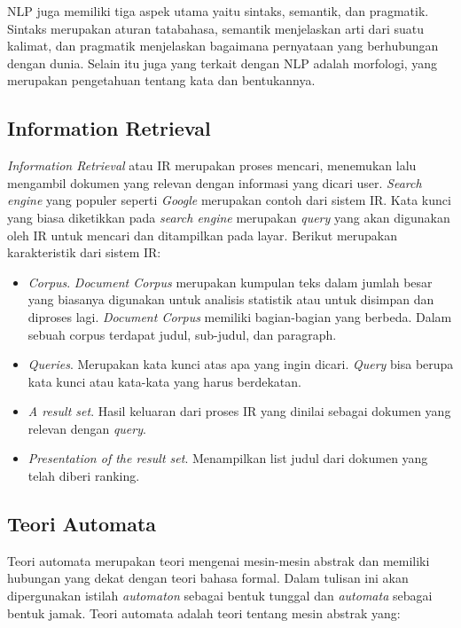 NLP juga memiliki tiga aspek utama yaitu sintaks, semantik, dan pragmatik. Sintaks merupakan aturan tatabahasa, semantik menjelaskan arti dari suatu kalimat, dan pragmatik menjelaskan bagaimana pernyataan yang berhubungan dengan dunia. Selain itu juga yang terkait dengan NLP adalah morfologi, yang merupakan pengetahuan tentang kata dan bentukannya.

\subsection{Information Retrieval\cite{kowalski2010information}}
\label{sec:ir}

\textit{Information Retrieval} atau IR merupakan proses mencari, menemukan lalu mengambil dokumen yang relevan dengan informasi yang dicari user. \textit{Search engine} yang populer seperti \textit{Google} merupakan contoh dari sistem IR. Kata kunci yang biasa diketikkan pada \textit{search engine} merupakan \textit{query} yang akan digunakan oleh IR untuk mencari dan ditampilkan pada layar. Berikut merupakan karakteristik dari sistem IR:

\begin{itemize}
	\item \textit{Corpus}. \textit{Document Corpus} merupakan kumpulan teks dalam jumlah besar yang biasanya digunakan untuk analisis statistik atau untuk disimpan dan diproses lagi. \textit{Document Corpus} memiliki bagian-bagian yang berbeda. Dalam sebuah corpus terdapat judul, sub-judul, dan paragraph.
	\item \textit{Queries}. Merupakan kata kunci atas apa yang ingin dicari. \textit{Query} bisa berupa kata kunci atau kata-kata yang harus berdekatan.
	\item \textit{A result set}. Hasil keluaran dari proses IR yang dinilai sebagai dokumen yang relevan dengan \textit{query}.
	\item \textit{Presentation of the result set}. Menampilkan list judul dari dokumen yang telah diberi ranking.
\end{itemize}

\subsection{Teori Automata\cite{Frisca:2014}}
Teori automata merupakan teori mengenai mesin-mesin abstrak dan memiliki hubungan yang dekat dengan teori bahasa formal. Dalam tulisan ini akan dipergunakan istilah \textit{automaton} sebagai bentuk tunggal dan \textit{automata} sebagai bentuk jamak. Teori automata adalah teori tentang mesin abstrak yang:

